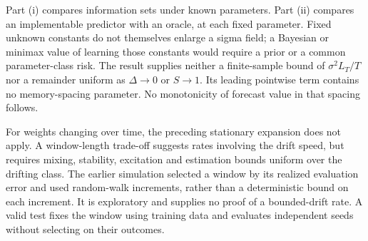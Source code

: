Part (i) compares information sets under known parameters. Part (ii) compares an implementable predictor with an oracle, at each fixed parameter. Fixed unknown constants do not themselves enlarge a sigma field; a Bayesian or minimax value of learning those constants would require a prior or a common parameter-class risk. The result supplies neither a finite-sample bound of $\sigma^2L_T/T$ nor a remainder uniform as $\Delta\to0$ or $S\to1$. Its leading pointwise term contains no memory-spacing parameter. No monotonicity of forecast value in that spacing follows.

\begin{remark}
For weights changing over time, the preceding stationary expansion does not apply. A window-length trade-off suggests rates involving the drift speed, but requires mixing, stability, excitation and estimation bounds uniform over the drifting class. The earlier simulation selected a window by its realized evaluation error and used random-walk increments, rather than a deterministic bound on each increment. It is exploratory and supplies no proof of a bounded-drift rate. A valid test fixes the window using training data and evaluates independent seeds without selecting on their outcomes.
\end{remark}


